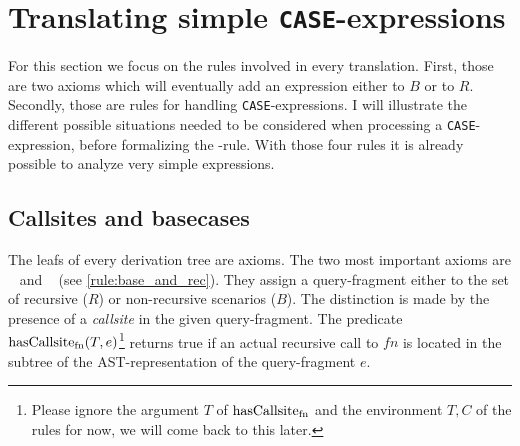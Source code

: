 \section{Translating simple \texttt{CASE}-expressions}

For this section we focus on the rules involved in every translation. First, those are two axioms which will eventually add an expression either to $B$ or to $R$. Secondly, those are rules for handling \texttt{CASE}-expressions. I will illustrate the different possible situations needed to be considered when processing a \texttt{CASE}-expression, before formalizing the \RWHEN-rule. With those four rules it is already possible to analyze very simple expressions.

\subsection{Callsites and basecases}

The leafs of every derivation tree are axioms. The two most important axioms are \RREC~ and \RBASE~ (see \autoref{rule:base_and_rec}). They assign a query-fragment either to the set of recursive ($R$) or non-recursive scenarios ($B$). The distinction is made by the presence of a \textit{callsite} in the given query-fragment. The predicate $\operatorname{\text{hasCallsite}_{fn}}(T, e)$\footnote{Please ignore the argument $T$ of $\operatorname{\text{hasCallsite}_{fn}}$ and the environment $T, C$ of the rules for now, we will come back to this later.} returns true if an actual recursive call to $fn$ is located in the subtree of the AST-representation of the query-fragment $e$.


